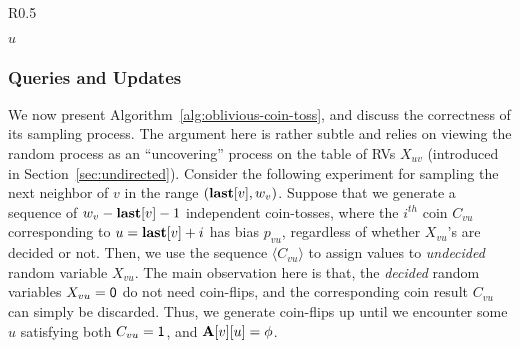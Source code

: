 \begin{wrapfigure}[15]{R}{0.5\textwidth}
\vspace{-2em}
\begin{framed}
    \renewcommand\figurename{Algorithm}
    \caption{Sampling }
    \label{alg:oblivious-coin-toss}
    \begin{algorithmic}[1]
            \State{$w_v \gets \min \{(P_v \cap (u, n]) \cup \{n+1\}\}$}
            \EndWhile
            \EndIf
            \State \Return $u$
        \EndProcedure
    \end{algorithmic}
\end{framed}
\end{wrapfigure}



\subsubsection{Queries and Updates}
\label{sec:nn-correctness}
We now present Algorithm~\ref{alg:oblivious-coin-toss}, and discuss the correctness of its sampling process.
The argument here is rather subtle and relies on viewing the random process as an ``uncovering'' process on the table of RVs $X_{uv}$
(introduced in Section~\ref{sec:undirected}).
Consider the following experiment for sampling the next neighbor of $v$ in the range $(\mathbf{last}[v],w_v)$.
Suppose that we generate a sequence of $w_v-\mathbf{last}[v]-1$ independent coin-tosses,
where the $i^{th}$ coin $C_{vu}$ corresponding to $u = \mathbf{last}[v]+i$ has bias $p_{vu}$, regardless of whether $X_{vu}$'s are decided or not.
Then, we use the sequence $\langle C_{vu} \rangle$ to assign values to \emph{undecided} random variable $X_{vu}$.
The main observation here is that, the \emph{decided} random variables $X_{vu} = \mathsf{0}$ do not need coin-flips,
and the corresponding coin result $C_{vu}$ can simply be discarded.
Thus, we generate coin-flips up until we encounter some $u$ satisfying both $C_{vu} = \mathsf{1}$, and $\mathbf{A}[v][u] = \phi$.


